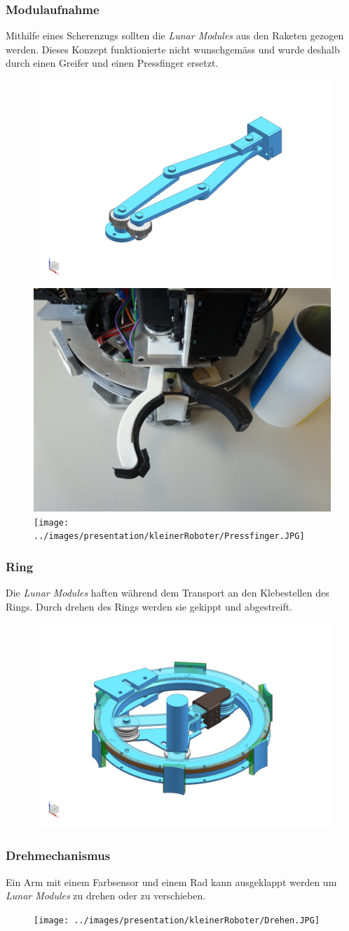 \begin{frame}
	\frametitle{Modulaufnahme}
	Mithilfe eines Scherenzugs sollten die \textit{Lunar Modules} aus den Raketen gezogen werden.
	Dieses Konzept funktionierte nicht wunschgemäss und wurde deshalb durch einen Greifer und einen Pressfinger ersetzt.\\
	
	\begin{figure}
		\includegraphics[height = 3 cm]{../images/presentation/kleinerRoboter/Schere.png}
		\hspace{1em}
		\includegraphics[height = 3 cm]{../images/presentation/kleinerRoboter/Greifer.JPG}
		\hspace{2em}
		\texttt{[image: ../images/presentation/kleinerRoboter/Pressfinger.JPG]}
	\end{figure}
\end{frame}

\begin{frame}
	\frametitle{Ring}
	Die \textit{Lunar Modules} haften während dem Transport an den Klebestellen des Rings.
	Durch drehen des Rings werden sie gekippt und abgestreift.
	\begin{figure}
		\centering
		\includegraphics[height = 4 cm]{../images/presentation/kleinerRoboter/Ring.png}
	\end{figure}
\end{frame}

\begin{frame}
	\frametitle{Drehmechanismus}
	Ein Arm mit einem Farbsensor und einem Rad kann ausgeklappt werden um \textit{Lunar Modules} zu drehen oder zu verschieben.
	\begin{figure}
		\centering
		\texttt{[image: ../images/presentation/kleinerRoboter/Drehen.JPG]}
	\end{figure}
\end{frame}
